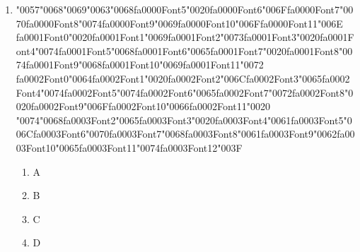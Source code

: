 \documentclass[12pt]{article}
\begin{document}
 \begin{enumerate}[label=Q\arabic*.]
 
 \item {\char"0057}{\char"0068}{\char"0069}{\char"0063}{\char"0068}{\csname fa0000Font5\endcsname\char"0020}{\csname fa0000Font6\endcsname\char"006F}{\csname fa0000Font7\endcsname\char"0070}{\csname fa0000Font8\endcsname\char"0074}{\csname fa0000Font9\endcsname\char"0069}{\csname fa0000Font10\endcsname\char"006F}{\csname fa0000Font11\endcsname\char"006E} {\csname fa0001Font0\endcsname\char"0020}{\csname fa0001Font1\endcsname\char"0069}{\csname fa0001Font2\endcsname\char"0073}{\csname fa0001Font3\endcsname\char"0020}{\csname fa0001Font4\endcsname\char"0074}{\csname fa0001Font5\endcsname\char"0068}{\csname fa0001Font6\endcsname\char"0065}{\csname fa0001Font7\endcsname\char"0020}{\csname fa0001Font8\endcsname\char"0074}{\csname fa0001Font9\endcsname\char"0068}{\csname fa0001Font10\endcsname\char"0069}{\csname fa0001Font11\endcsname\char"0072} {\csname fa0002Font0\endcsname\char"0064}{\csname fa0002Font1\endcsname\char"0020}{\csname fa0002Font2\endcsname\char"006C}{\csname fa0002Font3\endcsname\char"0065}{\csname fa0002Font4\endcsname\char"0074}{\csname fa0002Font5\endcsname\char"0074}{\csname fa0002Font6\endcsname\char"0065}{\csname fa0002Font7\endcsname\char"0072}{\csname fa0002Font8\endcsname\char"0020}{\csname fa0002Font9\endcsname\char"006F}{\csname fa0002Font10\endcsname\char"0066}{\csname fa0002Font11\endcsname\char"0020} {\char"0074}{\char"0068}{\csname fa0003Font2\endcsname\char"0065}{\csname fa0003Font3\endcsname\char"0020}{\csname fa0003Font4\endcsname\char"0061}{\csname fa0003Font5\endcsname\char"006C}{\csname fa0003Font6\endcsname\char"0070}{\csname fa0003Font7\endcsname\char"0068}{\csname fa0003Font8\endcsname\char"0061}{\csname fa0003Font9\endcsname\char"0062}{\csname fa0003Font10\endcsname\char"0065}{\csname fa0003Font11\endcsname\char"0074}{\csname fa0003Font12\endcsname\char"003F}
 \begin{enumerate}[label=(\Alph*)]
     \item A
     \item B
     \item C
     \item D
 \end{enumerate}
 

\end{enumerate}
\end{document}
